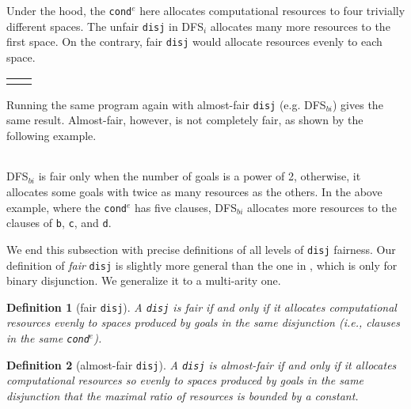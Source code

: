\documentclass[acmlarge, review=true]{acmart}
\newcommand{\conde}{\texttt{cond$^e$}}
\newcommand{\disj}{\texttt{disj}}
\newcommand{\DFSi }[0]{DFS$_{i}$}
\newcommand{\DFSbi}[0]{DFS$_{bi}$}
\newtheorem{defn}{Definition}[section]
\begin{document}
\begin{center}
	\begin{tabular}{c}
		
	\end{tabular}
\end{center}

Under the hood, the \conde{} here allocates computational resources to 
four trivially different spaces. The unfair \disj{} in 
\DFSi{} allocates many more resources to the first space. On the 
contrary, fair \disj{} would allocate resources evenly to each space. 

\begin{center}
	\begin{tabular}{l|r}
		 &
		
	\end{tabular}
\end{center}

Running the same program again with almost-fair \disj {} (e.g. 
\DFSbi{}) gives the same result. Almost-fair, however, is not 
completely fair, as shown by the following example. 

\begin{center}
	\begin{tabular}{c}
		
	\end{tabular}
\end{center}

\DFSbi{} is fair only when the number of goals is a power of 2, 
otherwise, it allocates some goals with twice as many resources as the 
others. In the above example, where the \conde{} has five clauses, \DFSbi{} 
allocates more resources to the clauses of \texttt{b}, \texttt{c}, and 
\texttt{d}.

We end this subsection with precise definitions of all levels of 
\disj{} fairness. Our definition of \emph{fair} \disj{} is slightly 
more general
than the one in \citet{seres1999algebra}, which is only
for binary disjunction. We generalize it to a multi-arity one.

\begin{defn}[fair \disj{}]
A \disj{} is fair if and only if it allocates computational resources evenly to 
spaces produced by goals in the same disjunction 
(i.e., clauses in the same \conde).
\end{defn}

\begin{defn}[almost-fair \disj{}]
A \disj{} is almost-fair if and only if it allocates computational resources
so evenly to spaces produced by goals in the same disjunction that 
the maximal ratio of resources is bounded by a constant.
\end{defn}
\end{document}
